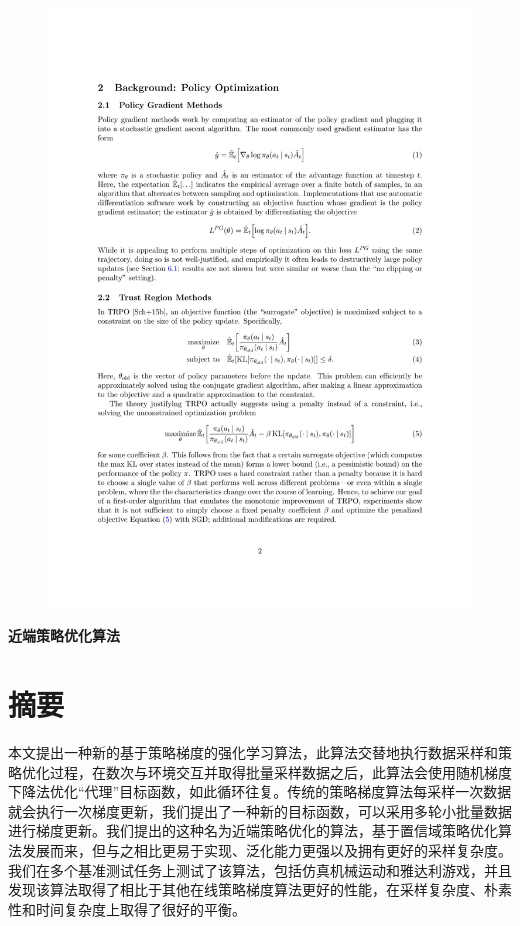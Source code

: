\documentclass[bachelor]{thesis-uestc}
\begin{document}
	\begin{figure}[h]
		\includegraphics[width=14cm]{./pic/ProximalPolicyOptimizationAlgorithms-02.jpg}
	\end{figure}
	
	\thesistranslationchinese
	\begin{center}
		\textbf{\large 近端策略优化算法}
	\end{center}

	\section{摘要}
	本文提出一种新的基于策略梯度的强化学习算法，此算法交替地执行数据采样和策略优化过程，在数次与环境交互并取得批量采样数据之后，此算法会使用随机梯度下降法优化“代理”目标函数，如此循环往复。传统的策略梯度算法每采样一次数据就会执行一次梯度更新，我们提出了一种新的目标函数，可以采用多轮小批量数据进行梯度更新。我们提出的这种名为近端策略优化的算法，基于置信域策略优化算法发展而来，但与之相比更易于实现、泛化能力更强以及拥有更好的采样复杂度。我们在多个基准测试任务上测试了该算法，包括仿真机械运动和雅达利游戏，并且发现该算法取得了相比于其他在线策略梯度算法更好的性能，在采样复杂度、朴素性和时间复杂度上取得了很好的平衡。
	
\end{document}
